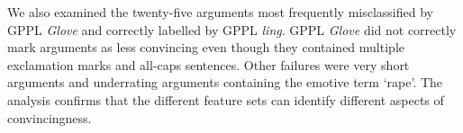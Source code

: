 We also examined the twenty-five arguments most frequently misclassified by GPPL \emph{Glove} and correctly labelled by GPPL \emph{ling}.
GPPL \emph{Glove} did not correctly mark arguments as less convincing 
even though they contained multiple exclamation marks and all-caps sentences. 
Other failures were very short arguments and underrating arguments containing the emotive term `rape'.
The analysis confirms that the different feature sets can identify different aspects of convincingness.

%
%
